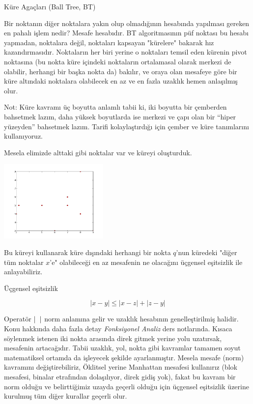 \documentclass[12pt,fleqn]{article}\usepackage{../../common}
\begin{document}
Küre Agaçları (Ball Tree, BT) 

Bir noktanın diğer noktalara yakın olup olmadığının hesabında yapılması
gereken en pahalı işlem nedir? Mesafe hesabıdır. BT algoritmasının püf
noktası bu hesabı yapmadan, noktalara değil, noktaları kapsayan "kürelere"
bakarak hız kazandırmasıdır. Noktaların her biri yerine o noktaları temsil
eden kürenin pivot noktasına (bu nokta küre içindeki noktaların ortalamasal
olarak merkezi de olabilir, herhangi bir başka nokta da) bakılır, ve oraya
olan mesafeye göre bir küre altındaki noktalara olabilecek en az ve en
fazla uzaklık hemen anlaşılmış olur.

Not: Küre kavramı üç boyutta anlamlı tabii ki, iki boyutta bir çemberden
bahsetmek lazım, daha yüksek boyutlarda ise merkezi ve çapı olan bir
``hiper yüzeyden'' bahsetmek lazım. Tarifi kolaylaştırdığı için çember ve
küre tanımlarını kullanıyoruz.

Mesela elimizde alttaki gibi noktalar var ve küreyi oluşturduk. 

\includegraphics[height=4cm]{knn0.png}

Bu küreyi kullanarak küre dışındaki herhangi bir nokta $q$'nun küredeki
"diğer tüm noktalar $x$'e" olabileceği en az mesafenin ne olacağını
üçgensel eşitsizlik ile anlayabiliriz.

Üçgensel eşitsizlik 

$$ |x-y| \le |x-z| + |z-y| $$

Operatör $|\hspace{0.2cm}|$ norm anlamına gelir ve uzaklık hesabının
genelleştirilmiş halidir. Konu hakkında daha fazla detay {\em Fonksiyonel
  Analiz} ders notlarında. Kısaca söylenmek istenen iki nokta arasında
direk gitmek yerine yolu uzatırsak, mesafenin artacağıdır. Tabii uzaklık,
yol, nokta gibi kavramlar tamamen soyut matematiksel ortamda da işleyecek
şekilde ayarlanmıştır. Mesela mesafe (norm) kavramını değiştirebiliriz,
Öklitsel yerine Manhattan mesafesi kullanırız (blok mesafesi, binalar
etrafından dolaşılıyor, direk gidiş yok), fakat bu kavram bir norm olduğu
ve belirttiğimiz uzayda geçerli olduğu için üçgensel eşitsizlik üzerine
kurulmuş tüm diğer kurallar geçerli olur.
\end{document}
